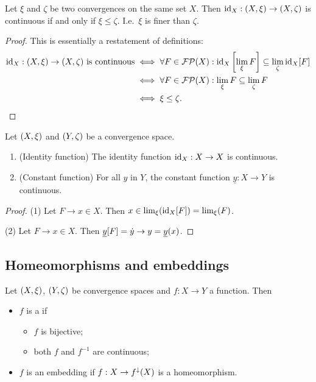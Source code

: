 \begin{lemma} \label{identityContinuity}
Let $\xi$ and $\zeta$ be two convergences on the same set $X$. Then $\operatorname{id}_X: \left( X,\xi \right) \to \left( X,\zeta \right)$ is continuous \textup{if and only if} $\xi \leq \zeta$. I.e.\ $\xi$ is finer than $\zeta$.
\end{lemma}
\begin{proof}
This is essentially a restatement of definitions:
\begin{align*}
\text{$\operatorname{id}_X: \left( X,\xi \right) \to \left( X,\zeta \right)$ is continuous} &\iff \forall F\in\operatorname{\mathcal{FP}}(X): \operatorname{id}_X\left[\lim_\xi F \right] \subseteq \lim_\zeta \operatorname{id}_X[F] \\
&\iff \forall F\in\operatorname{\mathcal{FP}}(X): \lim_\xi F \subseteq \lim_\zeta F \\
&\iff \xi \leq \zeta.
\end{align*}
\end{proof}

\begin{lemma} \label{continuityConstructions}
Let $\left( X,\xi \right)$ and $\left( Y,\zeta \right)$ be a convergence space.
\begin{enumerate}
\item \textup{(Identity function)} The identity function $\operatorname{id}_X:X\to X$ is continuous.
\item \textup{(Constant function)} For all $y$ in $Y$, the constant function $\underline{y}: X \to Y$ is continuous.
\end{enumerate}
\end{lemma}
\begin{proof}
(1) Let $F\to x \in X$. Then $x\in \lim_\xi(\operatorname{id}_X[F]) = \lim_\xi(F)$.

(2) Let $F\to x \in X$. Then $\underline{y}[F] = \dot{y} \to y = \underline{y}(x)$.
\end{proof}



\subsection{Homeomorphisms and embeddings}
\begin{definition}
Let $\left( X,\xi \right)$, $\left( Y,\zeta \right)$ be convergence spaces and $f: X\to Y$ a function. Then
\begin{itemize}
\item $f$ is a  if
\begin{itemize}
\item $f$ is bijective;
\item both $f$ and $f^{-1}$ are continuous;
\end{itemize}
\item $f$ is an embedding if $f: X\to f^\downarrow(X)$ is a homeomorphism.
\end{itemize}
\end{definition}

